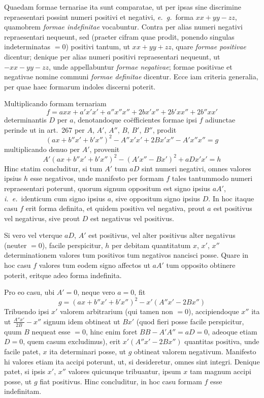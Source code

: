 Quaedam formae ternariae ita sunt comparatae, ut per ipsas sine discrimine
repraesentari possint numeri positivi et negativi, \textit{e.\ g.}\ forma $xx+yy-zz$, quamobrem
\textit{formae indefinitae} vocabuntur. Contra per alias numeri negativi repraesentari
nequeunt, sed (praeter cifram quae prodit, ponendo singulas indeterminatas
$=0$) positivi tantum, ut $xx+yy+zz$, quare \textit{formae positivae} dicentur; denique
per alias numeri positivi repraesentari nequeunt, ut $-xx-yy-zz$, unde
appellabuntur \textit{formae negativae}; formae positivae et negativae nomine communi
\textit{formae definitae} dicentur. Ecce iam criteria generalia, per quae haec formarum
indoles discerni poterit.

Multiplicando formam ternariam
\[
f=axx+a'x'x'+a''x''x''+2bx'x''+2b'xx''+2b''xx'
\]
determinantis $D$ per $a$, denotandoque co\"efficientes formae ipsi $f$ adiunctae
perinde ut in art.\ 267 per $A$, $A'$, $A''$, $B$, $B'$, $B''$, prodit
\[
(ax+b''x'+b'x'')^2-A''x'x'+2Bx'x''-A'x''x''=g
\]
multiplicando denuo per $A'$, provenit
\[
A'(ax+b''x'+b'x'')^2-(A'x''-Bx')^2+aDx'x'=h
\]
Hinc statim concluditur, si tum $A'$ tum $aD$ sint numeri negativi, omnes valores
ipsius $h$ esse negativos, unde manifesto per formam $f$ tales tantummodo numeri
repraesentari poterunt, quorum signum oppositum est signo ipsius $aA'$, \textit{i.\ e.}\ identicum
cum signo ipsius $a$, sive oppositum signo ipsius $D$. In hoc itaque casu $f$
erit forma definita, et quidem positiva vel negativa, prout $a$ est positivus vel
negativus, sive prout $D$ est negativus vel positivus.

Si vero vel vterque $aD$, $A'$ est positivus, vel alter positivus alter negativus
(neuter $=0$), facile perspicitur, $h$ per debitam quantitatum $x$, $x'$, $x''$ determinationem
valores tum positivos tum negativos nancisci posse. Quare in hoc casu
$f$ valores tum eodem signo affectos ut $aA'$ tum opposito obtinere poterit, eritque
adeo forma indefinita.

Pro eo casu, ubi $A'=0$, neque vero $a=0$, fit
\[
g=(ax+b''x'+b'x'')^2-x'(A''x'-2Bx'')
\]
Tribuendo ipsi $x'$ valorem arbitrarium (qui tamen non $=0$), accipiendoque $x''$
ita ut $\frac{A''x'}{2B}-x''$ signum idem obtineat ut $Bx'$ (quod fieri posse facile perspicitur,
quum $B$ nequeat esse $=0$, hinc enim foret $BB-A'A''=aD=0$, adeoque
etiam $D=0$, quem casum excludimus), erit $x'(A''x'-2Bx'')$ quantitas positiva,
unde facile patet, $x$ ita determinari posse, ut $g$ obtineat valorem negativum.
Manifesto hi valores etiam ita accipi poterunt, ut, si desideretur, omnes sint
integri. Denique patet, si ipsis $x'$, $x''$ valores quicunque tribuantur, ipsum $x$
tam magnum accipi posse, ut $g$ fiat positivus. Hinc concluditur, in hoc casu
formam $f$ esse indefinitam.
